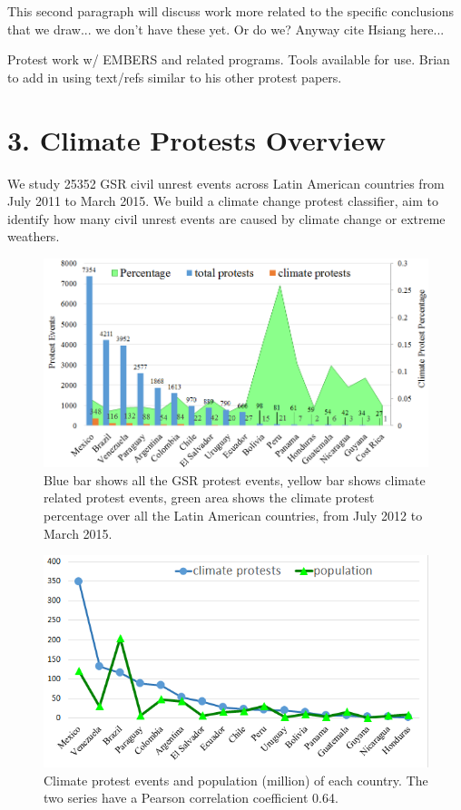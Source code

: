 \documentclass[9pt,twocolumn,twoside]{pnas-new}
\begin{document}
{\color{red} This second paragraph will discuss work more related to the specific conclusions that we draw... we don't have these yet. Or do we? Anyway cite Hsiang here...}

{\color{red} Protest work w/ EMBERS and related programs. Tools available for use. Brian to add in using text/refs similar to his other protest papers.}



\section*{3. Climate Protests Overview}
We study 25352 GSR civil unrest events across Latin American countries from July 2011 to March 2015. We build a climate change protest classifier, aim to identify how many civil unrest events are caused by climate change or extreme weathers.


\begin{figure}[ht]
\centerline
{\includegraphics[width=.45\textwidth]{figures/month-country-protest3}}
\caption{Blue bar shows all the GSR protest events, yellow bar shows climate related protest events, green area shows the climate protest percentage over all the Latin American countries, from July 2012 to March 2015.}
\label{month_percentage}
\end{figure}


\begin{figure}[ht]
\centerline
{\includegraphics[width=.4\textwidth]{figures/protest-population}}
\caption{Climate protest events and population (million) of each country. The two series have a Pearson correlation coefficient 0.64.}
\label{protest-population}
\end{figure}


\end{document}
